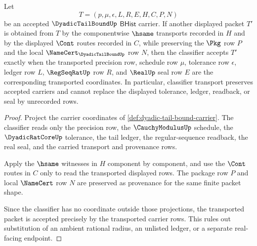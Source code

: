 \begin{theorem}
\label{thm:dyadic-tail-bound-classifier-transport-exactness}
Let
$$
T=(p,\mu,\epsilon,L,R,E,H,C,P,N)
$$
be an accepted $\DyadicTailBoundUp$ $\mathsf{BHist}$ carrier. If another displayed packet $T'$ is obtained from $T$ by the componentwise $\hsame$ transports recorded in $H$ and by the displayed $\Cont$ routes recorded in $C$, while preserving the $\Pkg$ row $P$ and the local $\NameCert_{\DyadicTailBoundUp}$ row $N$, then the classifier accepts $T'$ exactly when the transported precision row, schedule row $\mu$, tolerance row $\epsilon$, ledger row $L$, $\RegSeqRatUp$ row $R$, and $\RealUp$ seal row $E$ are the corresponding transported coordinates. In particular, classifier transport preserves accepted carriers and cannot replace the displayed tolerance, ledger, readback, or seal by unrecorded rows.
\end{theorem}
\begin{proof}
Project the carrier coordinates of \autoref{def:dyadic-tail-bound-carrier}. The classifier reads only the precision row, the $\CauchyModulusUp$ schedule, the $\DyadicRatCoreUp$ tolerance, the tail ledger, the regular-sequence readback, the real seal, and the carried transport and provenance rows.

Apply the $\hsame$ witnesses in $H$ component by component, and use the $\Cont$ routes in $C$ only to read the transported displayed rows. The package row $P$ and local $\NameCert$ row $N$ are preserved as provenance for the same finite packet shape.

Since the classifier has no coordinate outside those projections, the transported packet is accepted precisely by the transported carrier rows. This rules out substitution of an ambient rational radius, an unlisted ledger, or a separate real-facing endpoint.
\end{proof}

